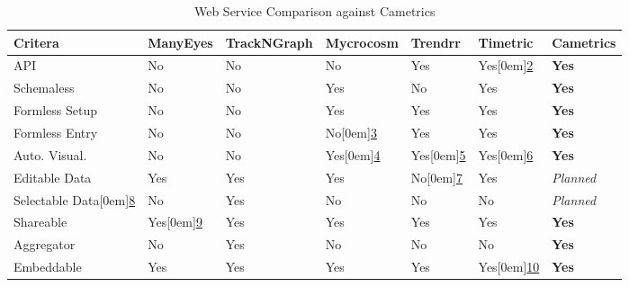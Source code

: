 \documentclass[10pt,a4paper,english]{article}
\newlength{\locallinewidth}
\begin{document}
\leavevmode
\begin{longtable}[c]{|p{0.18\locallinewidth}|p{0.114\locallinewidth}|p{0.104\locallinewidth}|p{0.114\locallinewidth}|p{0.104\locallinewidth}|p{0.104\locallinewidth}|p{0.124\locallinewidth}|}
\caption{Web Service Comparison against Cametrics}\\
\hline
\textbf{
Critera
} & \textbf{
ManyEyes
} & \textbf{
TrackNGraph
} & \textbf{
Mycrocosm
} & \textbf{
Trendrr
} & \textbf{
Timetric
} & \textbf{
Cametrics
} \\
\hline
\endhead

API
 & 
No
 & 
No
 & 
No
 & 
Yes
 & 
Yes\raisebox{.5em}[0em]{\scriptsize\hyperlink{id12}{2}}
 & 
\textbf{Yes}
 \\
\hline

Schemaless
 & 
No
 & 
No
 & 
Yes
 & 
No
 & 
Yes
 & 
\textbf{Yes}
 \\
\hline

Formless Setup
 & 
No
 & 
No
 & 
Yes
 & 
Yes
 & 
Yes
 & 
\textbf{Yes}
 \\
\hline

Formless Entry
 & 
No
 & 
No
 & 
No\raisebox{.5em}[0em]{\scriptsize\hyperlink{id13}{3}}
 & 
Yes
 & 
Yes
 & 
\textbf{Yes}
 \\
\hline

Auto. Visual.
 & 
No
 & 
No
 & 
Yes\raisebox{.5em}[0em]{\scriptsize\hyperlink{id14}{4}}
 & 
Yes\raisebox{.5em}[0em]{\scriptsize\hyperlink{id15}{5}}
 & 
Yes\raisebox{.5em}[0em]{\scriptsize\hyperlink{id16}{6}}
 & 
\textbf{Yes}
 \\
\hline

Editable Data
 & 
Yes
 & 
Yes
 & 
Yes
 & 
No\raisebox{.5em}[0em]{\scriptsize\hyperlink{id17}{7}}
 & 
Yes
 & 
\emph{Planned}
 \\
\hline

Selectable Data\raisebox{.5em}[0em]{\scriptsize\hyperlink{id18}{8}}
 & 
No
 & 
Yes
 & 
No
 & 
No
 & 
No
 & 
\emph{Planned}
 \\
\hline

Shareable
 & 
Yes\raisebox{.5em}[0em]{\scriptsize\hyperlink{id19}{9}}
 & 
Yes
 & 
Yes
 & 
Yes
 & 
Yes
 & 
\textbf{Yes}
 \\
\hline

Aggregator
 & 
No
 & 
Yes
 & 
No
 & 
No
 & 
No
 & 
\textbf{Yes}
 \\
\hline

Embeddable
 & 
Yes
 & 
Yes
 & 
Yes
 & 
Yes
 & 
Yes\raisebox{.5em}[0em]{\scriptsize\hyperlink{id20}{10}}
 & 
\textbf{Yes}
 \\
\hline
\end{longtable}
\end{document}
